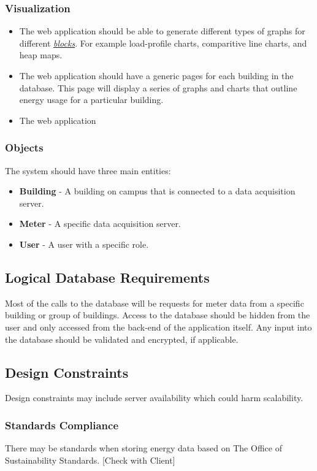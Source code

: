 \documentclass[onecolumn, draftclsnofoot,10pt, compsoc]{IEEEtran}
\begin{document}
    \subsubsection{Visualization}
    \begin{itemize}
        \item The web application should be able to generate different types of graphs for different \hyperref[definition]{\textit{blocks}}. For example load-profile charts, comparitive line charts, and heap maps.
        \item The web application should have a generic pages for each building in the database. This page will display a series of graphs and charts that outline energy usage for a particular building.
        \item The web application 
    \end{itemize}
    \subsubsection{Objects}
        The system should have three main entities: 
        \begin{itemize}
            \item \textbf{Building} - A building on campus that is connected to a data acquisition server.
            \item \textbf{Meter} - A specific data acquisition server.
            \item \textbf{User} - A user with a specific role.
        \end{itemize}
        
    \subsection{Logical Database Requirements}
    Most of the calls to the database will be requests for meter data from a specific building or group of buildings. Access to the database should be hidden from the user and only accessed from the back-end of the application itself. Any input into the database should be validated and encrypted, if applicable. 
    
    \subsection{Design Constraints}
    Design constraints may include server availability which could harm scalability.
    \subsubsection{Standards Compliance}
    There may be standards when storing energy data based on The Office of Sustainability Standards.
    [Check with Client]
\end{document}
